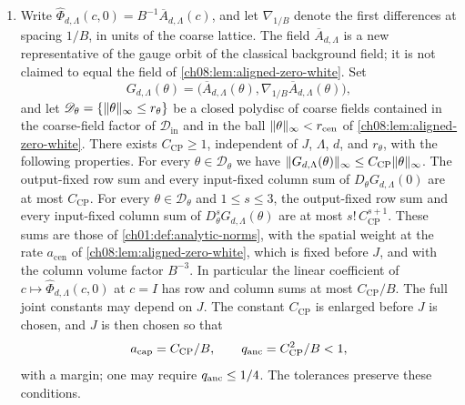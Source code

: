 \begin{theorem}
\begin{enumerate}
\[ \qquad
 \widehat\Phi_{d,\Lambda}=\Log\RepMap_{d,\Lambda},
\]
define maps $\widehat\Phi_{d,\Lambda}$ that satisfy the same strict domain conditions on the whole products and have common joint coefficient bounds, with all row and column sums, uniformly in $\Lambda$ and $d$. The thresholds depend only on the lattice pair, the deterministic domains, and the tolerances; they do not depend on the coupling, on samples, on sources, on an observation scale, on a position, or on the total number of RG steps. We call $\RepMap_{d,\Lambda}$ the reconstruction map and $\widehat\Phi_{d,\Lambda}$ its logarithmic coordinate representation.
\item Write $\widehat\Phi_{d,\Lambda}(c,0)=B^{-1}\overline A_{d,\Lambda}(c)$, and let $\nabla_{1/B}$ denote the first differences at spacing $1/B$, in units of the coarse lattice. The field $\overline A_{d,\Lambda}$ is a new representative of the gauge orbit of the classical background field; it is not claimed to equal the field of \cref{ch08:lem:aligned-zero-white}. Set
\[
 G_{d,\Lambda}(\theta)=\bigl(\overline A_{d,\Lambda}(\theta),\nabla_{1/B}\overline A_{d,\Lambda}(\theta)\bigr),
\]
and let $\mathscr D_\theta=\{\lVert \theta\rVert_\infty\le r_\theta\}$ be a closed polydisc of coarse fields contained in the coarse-field factor of $\mathscr D_{\mathrm{in}}$ and in the ball $\lVert \theta\rVert_\infty<r_{\mathrm{cen}}$ of \cref{ch08:lem:aligned-zero-white}. There exists $C_{\mathrm{CP}}\ge1$, independent of $J$, $\Lambda$, $d$, and $r_\theta$, with the following properties. For every $\theta\in\mathscr D_\theta$ we have $\lVert G_{d,\Lambda}(\theta)\rVert_\infty\le C_{\mathrm{CP}}\lVert \theta\rVert_\infty$. The output-fixed row sum and every input-fixed column sum of $D_\theta G_{d,\Lambda}(0)$ are at most $C_{\mathrm{CP}}$. For every $\theta\in\mathscr D_\theta$ and $1\le s\le3$, the output-fixed row sum and every input-fixed column sum of $D_\theta^sG_{d,\Lambda}(\theta)$ are at most $s!\,C_{\mathrm{CP}}^{s+1}$. These sums are those of \cref{ch01:def:analytic-norms}, with the spatial weight at the rate $a_{\mathrm{cen}}$ of \cref{ch08:lem:aligned-zero-white}, which is fixed before $J$, and with the column volume factor $B^{-3}$. In particular the linear coefficient of $c\mapsto\widehat\Phi_{d,\Lambda}(c,0)$ at $c=I$ has row and column sums at most $C_{\mathrm{CP}}/B$. The full joint constants may depend on $J$. The constant $C_{\mathrm{CP}}$ is enlarged before $J$ is chosen, and $J$ is then chosen so that
\[
 a_{\mathrm{cap}}=C_{\mathrm{CP}}/B,\qquad q_{\mathrm{anc}}=C_{\mathrm{CP}}^2/B<1,
\]
with a margin; one may require $q_{\mathrm{anc}}\le1/4$. The tolerances preserve these conditions.

\end{enumerate}
\end{theorem}
